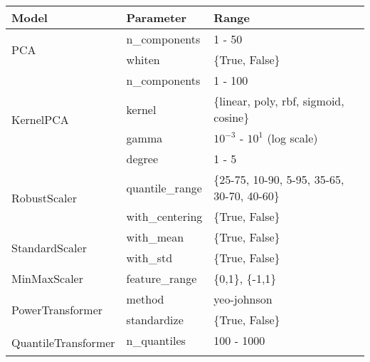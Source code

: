 \begin{table*}
\centering
\begin{tabular}{@{}l>{\ttfamily}lp{}@{}}
\toprule
\textbf{Model}                       & \textbf{Parameter}                & \textbf{Range}                           \\ \midrule
\multirow{2}{*}{PCA}                 & n\_components                     & 1 - 50                                   \\ \cmidrule{2-3}
                                     & whiten                            & \{True, False\}                          \\ \midrule
\multirow{4}{*}{KernelPCA}           & n\_components                     & 1 - 100                                  \\ \cmidrule{2-3}
                                     & kernel                            & \{linear, poly, rbf, sigmoid, cosine\}   \\ \cmidrule{2-3}
                                     & gamma                             & $10^{-3}$ - $10^{1}$ (log scale)         \\ \cmidrule{2-3}
                                     & degree                            & 1 - 5                                    \\ \midrule
\multirow{2}{*}{RobustScaler}        & quantile\_range                   & \{25-75, 10-90, 5-95, 35-65, 30-70, 40-60\} \\ \cmidrule{2-3}
                                     & with\_centering                   & \{True, False\}                          \\ \midrule
\multirow{2}{*}{StandardScaler}      & with\_mean                        & \{True, False\}                          \\ \cmidrule{2-3}
                                     & with\_std                         & \{True, False\}                          \\ \midrule
MinMaxScaler                         & feature\_range                    & \{0,1\}, \{-1,1\}                        \\ \midrule
\multirow{2}{*}{PowerTransformer}    & method                            & yeo-johnson                              \\ \cmidrule{2-3}
                                     & standardize                       & \{True, False\}                          \\ \midrule
\multirow{3}{*}{QuantileTransformer} & n\_quantiles                      & 100 - 1000                               \\ \cmidrule{2-3}

\end{tabular}
\end{table*}
